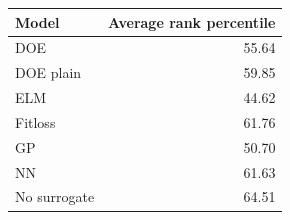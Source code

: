 \begin{tabular}{lr}
\toprule
Model & Average rank percentile \\
\midrule
DOE & 55.64 \\
DOE plain & 59.85 \\
ELM & 44.62 \\
Fitloss & 61.76 \\
GP & 50.70 \\
NN & 61.63 \\
No surrogate & 64.51 \\
\bottomrule
\end{tabular}

